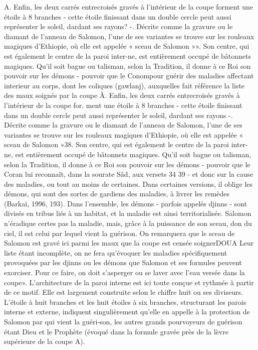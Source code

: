 A. Enfin, les deux carrés entrecroisés gravés à l'intérieur de la coupe forment une étoile à 8 branches - cette étoile finissant dans un double cercle peut aussi représenter le soleil, dardant ses rayons? -. Décrite comme la gravure ou le diamant de l'anneau de Salomon, l'une de ses variantes se trouve sur les rouleaux magiques d'Ethiopie, où elle est appelée « sceau de Salomon »». Son centre, qui est également le centre de la paroi inter-ne, est entièrement occupé de bâtonnets magiques. Qu'il soit bague ou talisman, selon la Tradition, il donne à ce Roi son pouvoir sur les démons
- pouvoir que le Conompour guérir des maladies affectant interieur au corps, dont les coliques (gawlanj), auxquelles fait référence la liste des maux soignés par la coupe À. Enfin, les deux carrés entrecroisés gravés à l'intérieur de la coupe for. ment une étoile à 8 branches - cette étoile finissant dans un double cercle peut aussi représenter le soleil, dardant ses rayons -. Décrite comme la gravure ou le diamant de l'anneau de Salomon, l'une de ses variantes se trouve sur les rouleaux magiques d'Ethiopie, où elle est appelée « sceau de Salomon »38. Son centre, qui est également le centre de la paroi inter-ne, est entièrement occupé de bâtonnets magiques. Qu'il soit bague ou talisman, selon la Tradition, il donne à ce Roi son pouvoir sur les démons
- pouvoir que le Coran lui reconnaît, dans la sourate Sâd, aux versets 34
39 - et donc sur la cause des maladies, ou tout au moins de certaines.
Dans certaines versions, il oblige les démons, qui sont des sortes de gardiens des maladies, à livrer les remèdes (Barkaï, 1996, 193). Dans l'ensemble, les démons - parfois appelés djinns - sont divisés en tribus liés à un habitat, et la maladie est ainsi territorialisée. Salomon n'éradique certes pas la maladie, mais, grâce à la puissance de son sceau, don du ciel, il est celui par lequel vient la guérison. On remarquera que le sceau de Salomon est gravé ici parmi les maux que la coupe est censée soignerDOUA
Leur liste étant incomplète, on ne fera qu'évoquer les maladies spécifiquement provoquées par les djinns ou les démons que Salomon et ses formules peuvent exorciser. Pour ce faire, on doit s'asperger ou se laver avec l'eau versée dans la coupe». L'architecture de la paroi interne est ici toute conçue et rythmée à partir de ce motif. Elle est largement construite selon le chiffre huit ou ses diviseurs. L'étoile à huit branches et les huit étoiles à six branches, structurant les parois interne et externe, indiquent singulièrement qu'elle en appelle à la protection de Salomon par qui vient la guéri-son, les autres grands pourvoyeurs de guérison étant Dieu et le Prophète (évoqué dans la formule gravée près de la lèvre supérieure de la coupe A).

